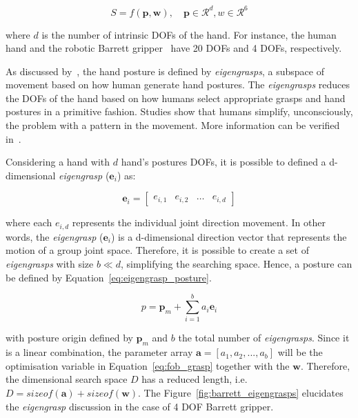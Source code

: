 \begin{equation}
S=f(\mathbf{p}, \mathbf{w}), \quad \mathbf{p} \in \mathcal{R}^{d}, w \in \mathcal{R}^{6}
\label{eq:fob_grasp}
\end{equation}

\noindent
where $d$ is the number of intrinsic \acp{DOF} of the hand. For instance, the human hand and the robotic Barrett gripper~\cite{barret_hand} have 20 \acp{DOF} and 4 \acp{DOF}, respectively.

As discussed by~\cite{Ciocarlie2009}, the hand posture is defined by \textit{eigengrasps}, a subspace of movement based on how human generate hand postures. The \textit{eigengrasps} reduces the \acp{DOF} of the hand based on how humans select appropriate grasps and hand postures in a primitive fashion. Studies show that humans simplify, unconsciously, the problem with a pattern in the movement. More information can be verified in~\cite{Ciocarlie2009,Santello2002}. 

Considering a hand with $d$ hand's postures DOFs, it is possible to defined a d-dimensional \textit{eigengrasp} ($\mathbf{e}_i$) as:

\begin{equation}
	\mathbf{e}_{i}=\left[\begin{array}{llll}
		e_{i, 1} & e_{i, 2} & \ldots & e_{i, d}
	\end{array}\right]
\end{equation}

\noindent where each $e_{i,d}$ represents the individual joint direction movement. In other words, the \textit{eigengrasp} ($\mathbf{e}_i$) is a d-dimensional direction vector that represents the motion of a group joint space. Therefore, it is possible to create a set of \textit{eigengrasps} with size $b \ll  d$, simplifying the searching space. Hence, a posture can be defined by Equation~\ref{eq:eigengrasp_posture}.

\begin{equation}
p=\mathbf{p}_m+\sum_{i=1}^{b} a_{i} \mathbf{e}_i
\label{eq:eigengrasp_posture}
\end{equation}


\noindent
with posture origin defined by $\mathbf{p}_m$ and $b$ the total number of \textit{eigengrasps}. Since it is a linear combination, the parameter array $\mathbf{a} = [a_1, a_2, ... , a_b]$  will be the optimisation variable in Equation~\ref{eq:fob_grasp} together with the $\mathbf{w}$. Therefore, the dimensional search space $D$ has a reduced length, i.e. $D = sizeof(\mathbf{a}) +  sizeof(\mathbf{w})$. The Figure~\ref{fig:barrett_eigengrasps} elucidates the \textit{eigengrasp} discussion in the case of 4 \ac{DOF} Barrett gripper.


